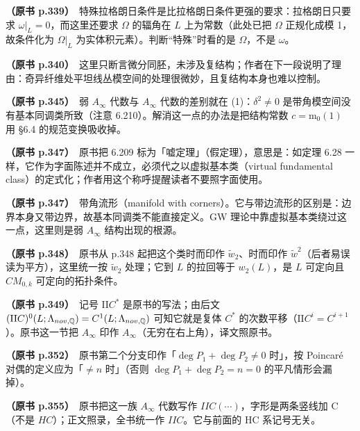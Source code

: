 \noindent \textbf{（原书 p.339）}\ 特殊拉格朗日条件是比拉格朗日条件更强的要求：拉格朗日只要求 $\omega|_L=0$，而这里还要求 $\Omega$ 的辐角在 $L$ 上为常数（此处已把 $\Omega$ 正规化成模 1，故条件化为 $\Omega|_L$ 为实体积元素）。判断“特殊”时看的是 $\Omega$，不是 $\omega$。\par\smallskip

\noindent \textbf{（原书 p.340）}\ 这里只断言微分同胚，未涉及复结构；作者在下一段说明了理由：奇异纤维处平坦线丛模空间的处理很微妙，且复结构本身也难以控制。\par\smallskip

\noindent \textbf{（原书 p.345）}\ 弱 $A_{\infty}$ 代数与 $A_{\infty}$ 代数的差别就在 (1)：$\delta^2\neq0$ 是带角模空间没有基本同调类所致（注意 6.210）。解消这一点的办法是把结构常数 $c=\mathrm{m}_0(1)$ 用 §6.4 的规范变换吸收掉。\par\smallskip

\noindent \textbf{（原书 p.347）}\ 原书把 6.209 标为「嘘定理」（假定理），意思是：如定理 6.28 一样，它作为字面陈述并不成立，必须代之以虚拟基本类（virtual fundamental class）的定式化；作者用这个称呼提醒读者不要照字面使用。\par\smallskip

\noindent \textbf{（原书 p.347）}\ 带角流形（manifold with corners）。它与带边流形的区别是：边界本身又带边界，故基本同调类不能直接定义。GW 理论中靠虚拟基本类绕过这一点，这里则是弱 $A_{\infty}$ 结构出现的根源。\par\smallskip

\noindent \textbf{（原书 p.348）}\ 原书从 p.348 起把这个类时而印作 $\tilde w_2$、时而印作 $\tilde w^2$（后者易误读为平方），这里统一按 $\tilde w_2$ 处理；它到 $L$ 的拉回等于 $w_2(L)$，是 $L$ 可定向且 $CM_{0,k}$ 可定向的拓扑条件。\par\smallskip

\noindent \textbf{（原书 p.349）}\ 记号 $\mathrm{II}C^*$ 是原书的写法；由后文 $(\mathrm{II}C)^0(L;\Lambda_{nov,\mathbb{Q}})=C^1(L;\Lambda_{nov,\mathbb{Q}})$ 可知它就是复体 $C^*$ 的次数平移（$\mathrm{II}C^i=C^{i+1}$）。原书这一节把 $A_\infty$ 印作 $A_{\infty}$（无穷在右上角），译文照原书。\par\smallskip

\noindent \textbf{（原书 p.352）}\ 原书第二个分支印作「$\deg P_1+\deg P_2\neq0$ 时」，按 Poincaré 对偶的定义应为「$\neq n$ 时」（否则 $\deg P_1+\deg P_2=n=0$ 的平凡情形会漏掉）。\par\smallskip

\noindent \textbf{（原书 p.355）}\ 原书把这一族 $A_{\infty}$ 代数写作 $\mathit{IIC}(\cdots)$，字形是两条竖线加 C（不是 $HC$）；正文照录，全书统一作 $\mathit{IIC}$。它与前面的 $\mathrm{HC}$ 系记号无关。\par\smallskip

